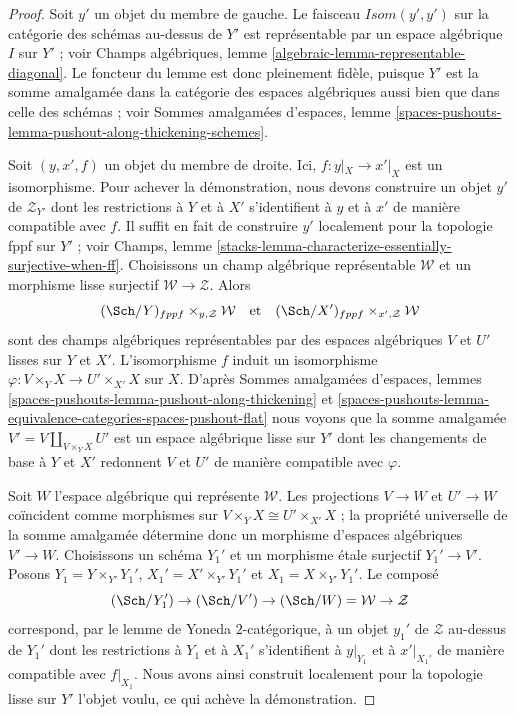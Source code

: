 \begin{proof}
Soit $y'$ un objet du membre de gauche. Le faisceau
$\mathit{Isom}(y', y')$ sur la catégorie des schémas au-dessus de $Y'$
est représentable par un espace algébrique $I$ sur $Y'$ ; voir
Champs algébriques, lemme \ref{algebraic-lemma-representable-diagonal}.
Le foncteur du lemme est donc pleinement fidèle, puisque
$Y'$ est la somme amalgamée dans la catégorie des espaces algébriques aussi bien
que dans celle des schémas ; voir
Sommes amalgamées d'espaces, lemme
\ref{spaces-pushouts-lemma-pushout-along-thickening-schemes}.

\medskip\noindent
Soit $(y, x', f)$ un objet du membre de droite. Ici, $f : y|_X \to x'|_X$
est un isomorphisme. Pour achever la démonstration, nous devons construire un objet $y'$ de
$\mathcal{Z}_{Y'}$ dont les restrictions à $Y$ et à $X'$ s'identifient à $y$ et à $x'$
de manière compatible avec $f$. Il suffit en fait de construire $y'$
localement pour la topologie fppf sur $Y'$ ; voir
Champs, lemme \ref{stacks-lemma-characterize-essentially-surjective-when-ff}.
Choisissons un champ algébrique représentable
$\mathcal{W}$ et un morphisme lisse surjectif $\mathcal{W} \to \mathcal{Z}$.
Alors
$$
(\Sch/Y)_{fppf} \times_{y, \mathcal{Z}} \mathcal{W}
\quad\text{et}\quad
(\Sch/X')_{fppf} \times_{x', \mathcal{Z}} \mathcal{W}
$$
sont des champs algébriques représentables par des espaces algébriques $V$ et $U'$
lisses sur $Y$ et $X'$. L'isomorphisme $f$ induit un isomorphisme
$\varphi : V \times_Y X \to U' \times_{X'} X$ sur $X$. D'après
Sommes amalgamées d'espaces, lemmes
\ref{spaces-pushouts-lemma-pushout-along-thickening} et
\ref{spaces-pushouts-lemma-equivalence-categories-spaces-pushout-flat}
nous voyons que la somme amalgamée $V' = V \amalg_{V \times_Y X} U'$ est
un espace algébrique lisse sur $Y'$ dont les changements de base à
$Y$ et $X'$ redonnent $V$ et $U'$ de manière compatible avec $\varphi$.

\medskip\noindent
Soit $W$ l'espace algébrique qui représente $\mathcal{W}$.
Les projections $V \to W$ et $U' \to W$ coïncident comme morphismes
sur $V \times_Y X \cong U' \times_{X'} X$ ; la propriété universelle
de la somme amalgamée détermine donc un morphisme d'espaces algébriques
$V' \to W$. Choisissons un schéma $Y_1'$ et un morphisme \'etale surjectif
$Y_1' \to V'$. Posons $Y_1 = Y \times_{Y'} Y_1'$,
$X_1' = X' \times_{Y'} Y_1'$ et $X_1 = X \times_{Y'} Y_1'$.
Le composé
$$
(\Sch/Y_1') \to (\Sch/V') \to (\Sch/W) = \mathcal{W} \to \mathcal{Z}
$$
correspond, par le lemme de Yoneda $2$-catégorique, à un objet $y_1'$ de $\mathcal{Z}$
au-dessus de $Y_1'$ dont les restrictions à $Y_1$ et à $X_1'$ s'identifient à $y|_{Y_1}$
et à $x'|_{X_1'}$ de manière compatible avec $f|_{X_1}$. Nous avons ainsi
construit localement pour la topologie lisse sur $Y'$ l'objet voulu, ce qui achève la démonstration.
\end{proof}








